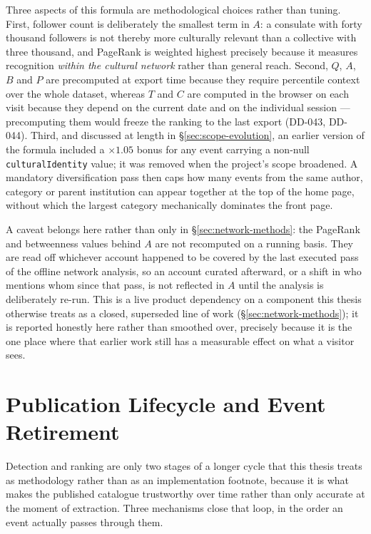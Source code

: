 \documentclass[12pt, a4paper]{report}
\begin{document}
Three aspects of this formula are methodological choices rather than
tuning. First, follower count is deliberately the smallest term in $A$:
a consulate with forty thousand followers is not thereby more culturally
relevant than a collective with three thousand, and PageRank is weighted
highest precisely because it measures recognition \emph{within the
cultural network} rather than general reach. Second, $Q$, $A$, $B$ and
$P$ are precomputed at export time because they require percentile
context over the whole dataset, whereas $T$ and $C$ are computed in the
browser on each visit because they depend on the current date and on the
individual session — precomputing them would freeze the ranking to the
last export (DD-043, DD-044). Third, and discussed at length in
\S\ref{sec:scope-evolution}, an earlier version of the formula included a
$\times 1.05$ bonus for any event carrying a non-null
\texttt{culturalIdentity} value; it was removed when the project's scope
broadened. A mandatory diversification pass then caps how many events
from the same author, category or parent institution can appear together
at the top of the home page, without which the largest category
mechanically dominates the front page.

A caveat belongs here rather than only in \S\ref{sec:network-methods}:
the PageRank and betweenness values behind $A$ are not recomputed on a
running basis. They are read off whichever account happened to be
covered by the last executed pass of the offline network analysis, so an
account curated afterward, or a shift in who mentions whom since that
pass, is not reflected in $A$ until the analysis is deliberately re-run.
This is a live product dependency on a component this thesis otherwise
treats as a closed, superseded line of work
(\S\ref{sec:network-methods}); it is reported honestly here rather
than smoothed over, precisely because it is the one place where that
earlier work still has a measurable effect on what a visitor sees.

\section{Publication Lifecycle and Event Retirement}
\label{sec:lifecycle}

Detection and ranking are only two stages of a longer cycle that this
thesis treats as methodology rather than as an implementation footnote,
because it is what makes the published catalogue trustworthy over time
rather than only accurate at the moment of extraction. Three mechanisms
close that loop, in the order an event actually passes through them.
\end{document}
